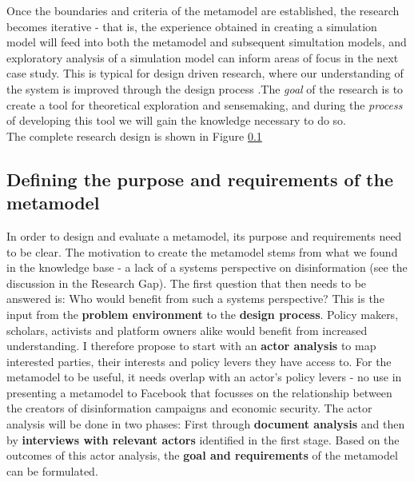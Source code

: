 Once the boundaries and criteria of the metamodel are established, the research becomes iterative - that is, the experience obtained in creating a simulation model will feed into both the metamodel and subsequent simultation models, and exploratory analysis of a simulation model can inform areas of focus in the next case study. This is typical for design driven research, where our understanding of the system is improved through the design process \cite{Hevner2004}.The \textit{goal} of the research is to create a tool for theoretical exploration and sensemaking, and during the \textit{process} of developing this tool we will gain the knowledge necessary to do so. \\

The complete research design is shown in Figure \ref{}


\subsection{Defining the purpose and requirements of the metamodel}
In order to design and evaluate a metamodel, its purpose and requirements need to be clear. The motivation to create the metamodel stems from what we found in the knowledge base - a lack of a systems perspective on disinformation (see the discussion in the Research Gap). The first question that then needs to be answered is: Who would benefit from such a systems perspective? This is the input from the \textbf{problem environment} to the \textbf{design process}. Policy makers, scholars, activists and platform owners alike would benefit from increased understanding. I therefore propose to start with an \textbf{actor analysis} to map interested parties, their interests and policy levers they have access to. For the metamodel to be useful, it needs overlap with an actor's policy levers - no use in presenting a metamodel to Facebook that focusses on the relationship between the creators of disinformation campaigns and economic security. The actor analysis will be done in two phases: First through \textbf{document analysis} and then by \textbf{interviews with relevant actors} identified in the first stage.  Based on the outcomes of this actor analysis, the \textbf{goal and requirements} of the metamodel can be formulated. \\


